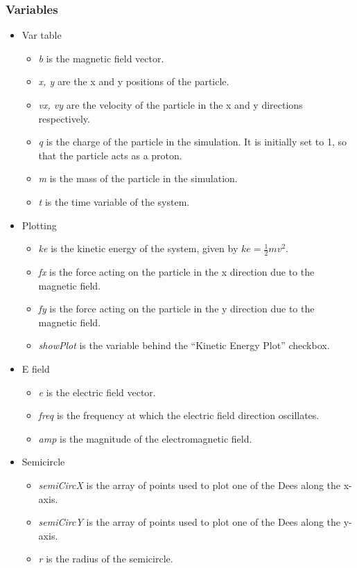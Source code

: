 \documentclass[11pt]{article}
\begin{document}
\subsubsection*{Variables}
\label{sec-1-3-1}
\begin{itemize}

\item Var table
\label{sec-1-3-1-1}%
\begin{itemize}
\item \emph{b} is the magnetic field vector.
\item \emph{x, y} are the x and y positions of the particle.
\item \emph{vx, vy} are the velocity of the particle in the x and y directions respectively.
\item \emph{q} is the charge of the particle in the simulation. It is initially
  set to 1, so that the particle acts as a proton.
\item \emph{m} is the mass of the particle in the simulation.
\item \emph{t} is the time variable of the system.
\end{itemize}

\item Plotting
\label{sec-1-3-1-2}%
\begin{itemize}
\item \emph{ke} is the kinetic energy of the system, given by $ke = \frac{1}{2}mv^2$.
\item \emph{fx} is the force acting on the particle in the x direction due to
  the magnetic field.
\item \emph{fy} is the force acting on the particle in the y direction due to
  the magnetic field.
\item \emph{showPlot} is the variable behind the ``Kinetic Energy Plot'' checkbox.
\end{itemize}


\item E field
\label{sec-1-3-1-3}%
\begin{itemize}
\item \emph{e} is the electric field vector.
\item \emph{freq} is the frequency at which the electric field direction oscillates.
\item \emph{amp} is the magnitude of the electromagnetic field.
\end{itemize}


\item Semicircle
\label{sec-1-3-1-4}%
\begin{itemize}
\item \emph{semiCircX} is the array of points used to plot one of the Dees
  along the x-axis.
\item \emph{semiCircY} is the array of points used to plot one of the Dees
  along the y-axis.
\item \emph{r} is the radius of the semicircle.
\end{itemize}

\end{itemize} %
\end{document}
